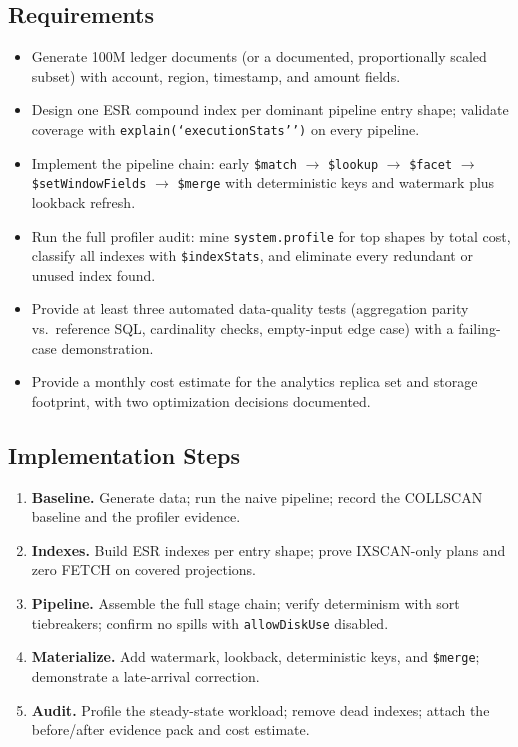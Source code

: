 \subsection*{Requirements}
\begin{itemize}
    \item Generate 100M ledger documents (or a documented, proportionally scaled subset) with account, region, timestamp, and amount fields.
    \item Design one ESR compound index per dominant pipeline entry shape; validate coverage with \texttt{explain(`executionStats'')} on every pipeline.
    \item Implement the pipeline chain: early \texttt{\$match} $\to$ \texttt{\$lookup} $\to$ \texttt{\$facet} $\to$ \texttt{\$setWindowFields} $\to$ \texttt{\$merge} with deterministic keys and watermark plus lookback refresh.
    \item Run the full profiler audit: mine \texttt{system.profile} for top shapes by total cost, classify all indexes with \texttt{\$indexStats}, and eliminate every redundant or unused index found.
    \item Provide at least three automated data-quality tests (aggregation parity vs.\ reference SQL, cardinality checks, empty-input edge case) with a failing-case demonstration.
    \item Provide a monthly cost estimate for the analytics replica set and storage footprint, with two optimization decisions documented.
\end{itemize}

\subsection*{Implementation Steps}
\begin{enumerate}
    \item \textbf{Baseline.} Generate data; run the naive pipeline; record the COLLSCAN baseline and the profiler evidence.
    \item \textbf{Indexes.} Build ESR indexes per entry shape; prove IXSCAN-only plans and zero FETCH on covered projections.
    \item \textbf{Pipeline.} Assemble the full stage chain; verify determinism with sort tiebreakers; confirm no spills with \texttt{allowDiskUse} disabled.
    \item \textbf{Materialize.} Add watermark, lookback, deterministic keys, and \texttt{\$merge}; demonstrate a late-arrival correction.
    \item \textbf{Audit.} Profile the steady-state workload; remove dead indexes; attach the before/after evidence pack and cost estimate.
\end{enumerate}

